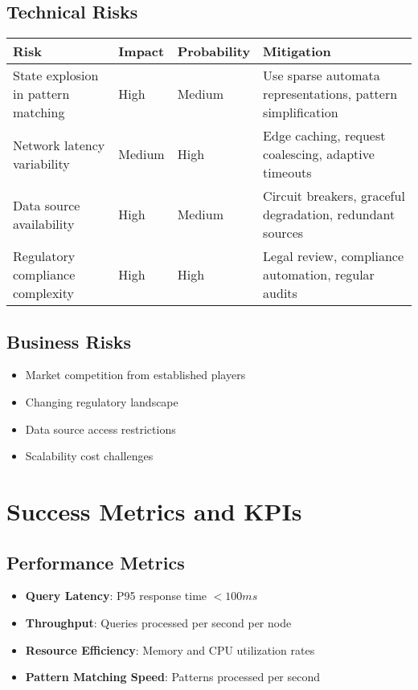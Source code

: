 \documentclass[11pt,a4paper]{article}
\begin{document}
\subsection{Technical Risks}
\begin{longtable}{|p{3cm}|p{3cm}|p{3cm}|p{3cm}|}
\toprule
\textbf{Risk} & \textbf{Impact} & \textbf{Probability} & \textbf{Mitigation} \\
\midrule
State explosion in pattern matching & High & Medium & Use sparse automata representations, pattern simplification \\
\midrule
Network latency variability & Medium & High & Edge caching, request coalescing, adaptive timeouts \\
\midrule
Data source availability & High & Medium & Circuit breakers, graceful degradation, redundant sources \\
\midrule
Regulatory compliance complexity & High & High & Legal review, compliance automation, regular audits \\
\bottomrule
\end{longtable}

\subsection{Business Risks}
\begin{itemize}
\item Market competition from established players
\item Changing regulatory landscape
\item Data source access restrictions
\item Scalability cost challenges
\end{itemize}

\section{Success Metrics and KPIs}

\subsection{Performance Metrics}
\begin{itemize}
\item \textbf{Query Latency}: P95 response time $< 100ms$
\item \textbf{Throughput}: Queries processed per second per node
\item \textbf{Resource Efficiency}: Memory and CPU utilization rates
\item \textbf{Pattern Matching Speed}: Patterns processed per second
\end{itemize}
\end{document}
